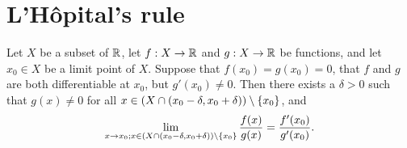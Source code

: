 \section{L'Hôpital's rule}\label{i:sec:10.5}

\begin{prop}\label{i:10.5.1}
  Let \(X\) be a subset of \(\mathbb{R}\), let \(f : X \to \mathbb{R}\) and \(g : X \to \mathbb{R}\) be functions, and let \(x_0 \in X\) be a limit point of \(X\).
  Suppose that \(f(x_0) = g(x_0) = 0\), that \(f\) and \(g\) are both differentiable at \(x_0\), but \(g'(x_0) \neq 0\).
  Then there exists a \(\delta > 0\) such that \(g(x) \neq 0\) for all \(x \in (X \cap (x_0 - \delta, x_0 + \delta)) \setminus \left\lbrace x_0\right\rbrace\), and
  \[
    \lim_{x \to x_0 ; x \in (X \cap (x_0 - \delta, x_0 + \delta)) \setminus \left\lbrace x_0\right\rbrace} \dfrac{f(x)}{g(x)} = \dfrac{f'(x_0)}{g'(x_0)}.
  \]
\end{prop}


